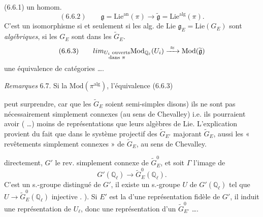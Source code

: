 \documentclass[11pt,a4paper]{article}
\begin{document}
 (6.6.1)  un homom.
\[
  (6.6.2)\qquad \mathfrak{g} = \mathrm{Lie}^{\mathrm{an}}(\pi) \longrightarrow \widetilde{\mathfrak{g}} = \mathrm{Lie}^{\mathrm{alg}}(\pi) .
\]
C'est un isomorphisme si et seulement si les alg. de Lie
$\mathfrak{g}_E = \mathrm{Lie}(G_E)$ sont \emph{algébriques},  si
\ill{} \struck{\ill{}} \add{\ill{}} les $G_E$ sont  dans les
$\widetilde{G}_E$.  \ill{} 
\[
  (6.6.3)\qquad \varinjlim_{\substack{U_i \text{ ouverts}\\ \text{dans } \pi}} \mathrm{Mod}_{\mathbb{Q}_\ell}(U_i) \xrightarrow{\ \approx\ } \mathrm{Mod}(\widetilde{\mathfrak{g}})
\]
\ill{}  une équivalence de catégories ….

\emph{Remarques} 6.7. Si \ill{} \ill{} la  \ill{} \ill{}
$\mathrm{Mod}(\pi^{\mathrm{alg}})$, l'équivalence \ill{} (6.6.3) \ill{}

peut surprendre, car   que les $\widetilde{G}_E$
soient semi-simples disons)  ils ne sont
pas nécessairement simplement connexes (au sens de Chevalley) i.e. ils
pourraient avoir ( …) moins de représentations que leurs
algèbres de Lie. L'explication provient du fait que dans le système projectif
des $\widetilde{G}_{E'}$ majorant $\widetilde{G}_E$,  aussi les
« revêtements simplement connexes » de $\widetilde{G}_E$, au sens de Chevalley.

   directement, \struck{\ill{} \ill{}}
  $G'$ le rev. simplement connexe de
$\widetilde{G}_E^{0}$, et soit $\Gamma$ l'image de 
\[
  G'(\mathbb{Q}_\ell) \longrightarrow \widetilde{G}_E^{0}(\mathbb{Q}_\ell).
\]
C'est un s.-groupe distingué de $G'$,  il existe un s.-groupe
 $U$ de $G'(\mathbb{Q}_\ell)$ tel que
$U \to \widetilde{G}_E^{0}(\mathbb{Q}_\ell)$ \ill{} \struck{\ill{}} 
injective \uncertain{\ill{}}. \ill{} \ill{}). Si $E'$ est la  d'une
représentation   fidèle de $G'$, il induit
une représentation  de $U_\ell$, donc une représentation \ill{} d'un
$\widetilde{G}_{E'}^{0}$ ….
\end{document}
